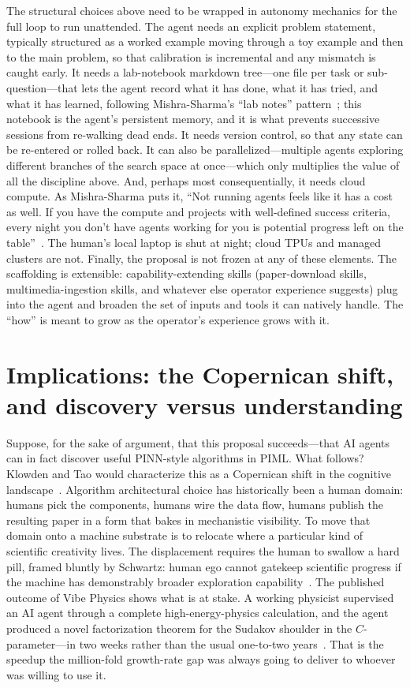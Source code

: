 \documentclass[11pt]{article}
\begin{document}
The structural choices above need to be wrapped in autonomy mechanics for the full loop to run unattended. The agent needs an explicit problem statement, typically structured as a worked example moving through a toy example and then to the main problem, so that calibration is incremental and any mismatch is caught early. It needs a lab-notebook markdown tree---one file per task or sub-question---that lets the agent record what it has done, what it has tried, and what it has learned, following Mishra-Sharma's ``lab notes'' pattern~\cite{mishra2026longrunning}; this notebook is the agent's persistent memory, and it is what prevents successive sessions from re-walking dead ends. It needs version control, so that any state can be re-entered or rolled back. It can also be parallelized---multiple agents exploring different branches of the search space at once---which only multiplies the value of all the discipline above. And, perhaps most consequentially, it needs cloud compute. As Mishra-Sharma puts it, ``Not running agents feels like it has a cost as well. If you have the compute and projects with well-defined success criteria, every night you don't have agents working for you is potential progress left on the table''~\cite{mishra2026longrunning}. The human's local laptop is shut at night; cloud TPUs and managed clusters are not. Finally, the proposal is not frozen at any of these elements. The scaffolding is extensible: capability-extending skills (paper-download skills, multimedia-ingestion skills, and whatever else operator experience suggests) plug into the agent and broaden the set of inputs and tools it can natively handle. The ``how'' is meant to grow as the operator's experience grows with it.

\section{Implications: the Copernican shift, and discovery versus understanding}

Suppose, for the sake of argument, that this proposal succeeds---that AI agents can in fact discover useful PINN-style algorithms in PIML. What follows? Klowden and Tao would characterize this as a Copernican shift in the cognitive landscape~\cite{klowden2026math}. Algorithm architectural choice has historically been a human domain: humans pick the components, humans wire the data flow, humans publish the resulting paper in a form that bakes in mechanistic visibility. To move that domain onto a machine substrate is to relocate where a particular kind of scientific creativity lives. The displacement requires the human to swallow a hard pill, framed bluntly by Schwartz: human ego cannot gatekeep scientific progress if the machine has demonstrably broader exploration capability~\cite{schwartz2026vibe}. The published outcome of Vibe Physics shows what is at stake. A working physicist supervised an AI agent through a complete high-energy-physics calculation, and the agent produced a novel factorization theorem for the Sudakov shoulder in the $C$-parameter---in two weeks rather than the usual one-to-two years~\cite{schwartz2026sudakov}. That is the speedup the million-fold growth-rate gap was always going to deliver to whoever was willing to use it.
\end{document}
